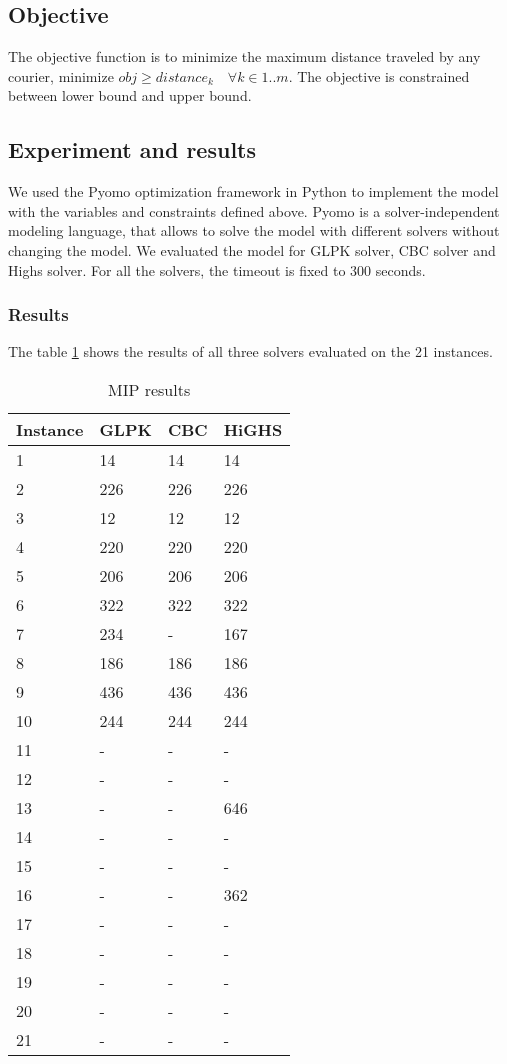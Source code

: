 \documentclass{article}
\begin{document}
\subsection{Objective}
The objective function is to minimize the maximum distance traveled by any courier, minimize $obj \geq distance_k \quad \forall k \in 1..m$. The objective is constrained between lower bound and upper bound.
\subsection{Experiment and results}
We used the Pyomo optimization framework in Python to implement the model with the variables and constraints defined above. Pyomo is a solver-independent modeling language, that allows to solve the model with different solvers without changing the model. We evaluated the model for GLPK solver, CBC solver and Highs solver. For all the solvers, the timeout is fixed to 300 seconds.

\subsubsection{Results}
The table \ref{table:mip-table} shows the results of all three solvers evaluated on the 21 instances.

\begin{table}[!ht]
    \centering
    \begin{tabular}{|l|l|l|l|}
    \hline
        Instance & GLPK & CBC & HiGHS  \\ \hline
        1 & 14 & 14 & 14 \\ \hline
        2 & 226 & 226 & 226 \\ \hline
        3 & 12 & 12 & 12 \\ \hline
        4 & 220 & 220 & 220 \\ \hline
        5 & 206 & 206 & 206 \\ \hline
        6 & 322 & 322 & 322 \\ \hline
        7 & 234 & - & 167 \\ \hline
        8 & 186 & 186 & 186 \\ \hline
        9 & 436 & 436 & 436 \\ \hline
        10 & 244 & 244 & 244 \\ \hline
        11 & - & - & - \\ \hline
        12 & - & - & - \\ \hline
        13 & - & - & 646 \\ \hline
        14 & - & - & - \\ \hline
        15 & - & - & - \\ \hline
        16 & - & - & 362 \\ \hline
        17 & - & - & - \\ \hline
        18 & - & - & - \\ \hline
        19 & - & - & - \\ \hline
        20 & - & - & - \\ \hline
        21 & - & - & - \\ \hline
    \end{tabular}
\label{table:mip-table}
\caption{MIP results}
\end{table}



\end{document}
